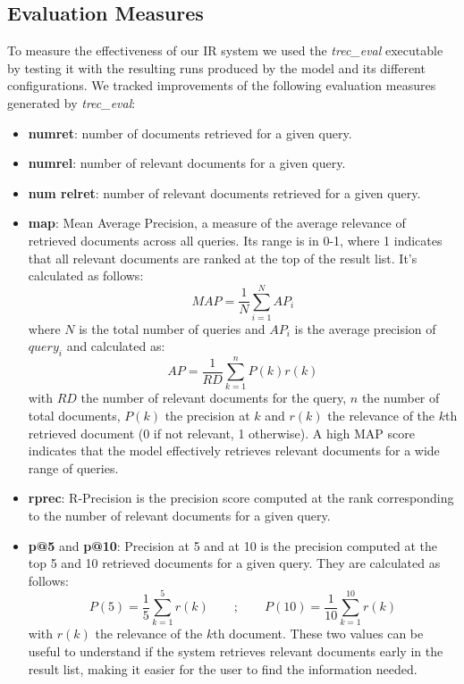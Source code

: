 \subsection{Evaluation Measures}
To measure the effectiveness of our \ac{IR} system we used the \textit{trec\_eval} executable by testing it with the resulting runs produced by the model and its different configurations.
\newline
We tracked improvements of the following evaluation measures generated by \textit{trec\_eval}:
\begin{itemize}
	\item \textbf{num\textunderscore ret}: number of documents retrieved for a given query.
	\item \textbf{num\textunderscore rel}: number of relevant documents for a given query.
	\item \textbf{num \textunderscore rel\textunderscore ret}: number of relevant documents retrieved for a given query.
    \item \textbf{map}: Mean Average Precision, a measure of the average relevance of retrieved documents across all queries. Its range is in 0-1, where 1 indicates that all relevant documents are ranked at the top of the result list.
    \newline
    It's calculated as follows:
    \begin{equation*}
        MAP = \frac{1}{N} \sum_{i=1}^{N}AP_i
    \end{equation*}
    where $N$ is the total number of queries and $AP_i$ is the average precision of $query_i$ and calculated as:
    \begin{equation*}
        AP = \frac{1}{RD} \sum_{k=1}^{n}P(k)r(k)
    \end{equation*}
    with $RD$ the number of relevant documents for the query, $n$ the number of total documents, $P(k)$ the precision at $k$ and $r(k)$ the relevance of the $k$th retrieved document (0 if not relevant, 1 otherwise).
    \newline
    A high \ac{MAP} score indicates that the model effectively retrieves relevant documents for a wide range of queries.
    \item \textbf{rprec}: R-Precision is the precision score computed at the rank corresponding to the number of relevant documents for a given query.
    \item \textbf{p@5} and \textbf{p@10}: Precision at 5 and at 10 is the precision computed at the top 5 and 10 retrieved documents for a given query.
    They are calculated as follows:
    \begin{equation*}
        P(5) = \frac{1}{5} \sum_{k=1}^{5}r(k) \qquad ; \qquad P(10) = \frac{1}{10} \sum_{k=1}^{10}r(k)
    \end{equation*}
    with $r(k)$ the relevance of the $k$th document.
    \newline
    These two values can be useful to understand if the system retrieves relevant documents early in the result list, making it easier for the user to find the information needed.

\end{itemize}


